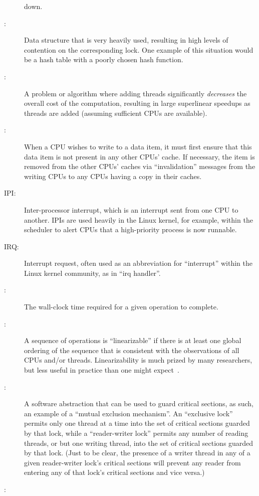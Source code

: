 \begin{description}
	down.
\item[\IX{Hot Spot}:]
	Data structure that is very heavily used, resulting in high
	levels of contention on the corresponding lock.
	One example of this situation would be a hash table with
	a poorly chosen hash function.
\item[\IX{Humiliatingly Parallel}:]
	A problem or algorithm where adding threads significantly
	\emph{decreases} the overall cost of the computation, resulting in
	large superlinear speedups as threads are added (assuming sufficient
	CPUs are available).
\item[\IX{Invalidation}:]
	When a CPU wishes to write to a data item, it must first ensure
	that this data item is not present in any other CPUs' cache.
	If necessary, the item is removed from the other CPUs' caches
	via ``invalidation'' messages from the writing CPUs to any
	CPUs having a copy in their caches.
\item[IPI:]
	Inter-processor interrupt, which is an
	interrupt sent from one CPU to another.
	IPIs are used heavily in the Linux kernel, for example, within
	the scheduler to alert CPUs that a high-priority process is now
	runnable.
\item[IRQ:]
	Interrupt request, often used as an abbreviation for ``interrupt''
	within the Linux kernel community, as in ``irq handler''.
\item[\IX{Latency}:]
	The wall-clock time required for a given operation to complete.
\item[\IX{Linearizable}:]
	A sequence of operations is ``linearizable'' if there is at
	least one global ordering of the sequence that is consistent
	with the observations of all CPUs and/or threads.
	Linearizability is much prized by many researchers, but less
	useful in practice than one might
	expect~\cite{AndreasHaas2012FIFOisnt}.
\item[\IX{Lock}:]
	A software abstraction that can be used to guard critical sections,
	as such, an example of a ``mutual exclusion mechanism''.
	An ``exclusive lock'' permits only one thread at a time into the
	set of critical sections guarded by that lock, while a
	``reader-writer lock'' permits any number of reading
	threads, or but one writing thread, into the set of critical
	sections guarded by that lock.
	(Just to be clear, the presence	of a writer thread in any of
	a given reader-writer lock's critical sections will prevent
	any reader from entering any of that lock's critical sections
	and vice versa.)
\item[\IX{Lock Contention}:]

\end{description}
